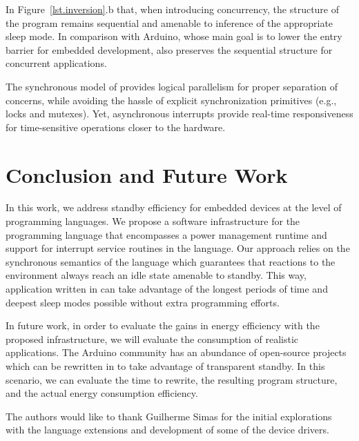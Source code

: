 In Figure~\ref{lst.inversion}.b that, when introducing concurrency, the
structure of the program remains sequential and amenable to inference of the
appropriate sleep mode.
In comparison with Arduino, whose main goal is to lower the entry barrier for
embedded development, \CEU also preserves the sequential structure for
concurrent applications.

The synchronous model of \CEU provides logical parallelism for proper
separation of concerns, while avoiding the hassle of explicit synchronization
primitives (e.g., locks and mutexes).
%
Yet, asynchronous interrupts provide real-time responsiveness for
time-sensitive operations closer to the hardware.

\section{Conclusion and Future Work}
\label{sec.conclusion}

In this work, we address standby efficiency for embedded devices at the level
of programming languages.
%
We propose a software infrastructure for the programming language \CEU that
encompasses a power management runtime and support for interrupt service
routines in the language.
%
Our approach relies on the synchronous semantics of the language which
guarantees that reactions to the environment always reach an idle state
amenable to standby.
%
This way, application written in \CEU can take advantage of the longest periods
of time and deepest sleep modes possible without extra programming efforts.

In future work, in order to evaluate the gains in energy efficiency with the
proposed infrastructure, we will evaluate the consumption of realistic
applications.
%
The Arduino community has an abundance of open-source projects which can be
rewritten in \CEU to take advantage of transparent standby.
%
In this scenario, we can evaluate the time to rewrite, the resulting program
structure, and the actual energy consumption efficiency.

\begin{acks}
The authors would like to thank Guilherme Simas for the initial explorations
with the language extensions and development of some of the device drivers.
\end{acks}
